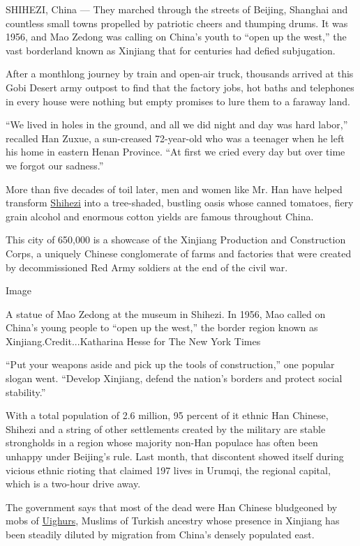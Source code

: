 SHIHEZI, China --- They marched through the streets of Beijing, Shanghai
and countless small towns propelled by patriotic cheers and thumping
drums. It was 1956, and Mao Zedong was calling on China's youth to
``open up the west,'' the vast borderland known as Xinjiang that for
centuries had defied subjugation.

After a monthlong journey by train and open-air truck, thousands arrived
at this Gobi Desert army outpost to find that the factory jobs, hot
baths and telephones in every house were nothing but empty promises to
lure them to a faraway land.

``We lived in holes in the ground, and all we did night and day was hard
labor,'' recalled Han Zuxue, a sun-creased 72-year-old who was a
teenager when he left his home in eastern Henan Province. ``At first we
cried every day but over time we forgot our sadness.''

More than five decades of toil later, men and women like Mr. Han have
helped transform
\href{http://www.china.org.cn/english/2004/Oct/108620.htm}{Shihezi} into
a tree-shaded, bustling oasis whose canned tomatoes, fiery grain alcohol
and enormous cotton yields are famous throughout China.

This city of 650,000 is a showcase of the Xinjiang Production and
Construction Corps, a uniquely Chinese conglomerate of farms and
factories that were created by decommissioned Red Army soldiers at the
end of the civil war.

Image

A statue of Mao Zedong at the museum in Shihezi. In 1956, Mao called on
China's young people to ``open up the west,'' the border region known as
Xinjiang.Credit...Katharina Hesse for The New York Times

``Put your weapons aside and pick up the tools of construction,'' one
popular slogan went. ``Develop Xinjiang, defend the nation's borders and
protect social stability.''

With a total population of 2.6 million, 95 percent of it ethnic Han
Chinese, Shihezi and a string of other settlements created by the
military are stable strongholds in a region whose majority non-Han
populace has often been unhappy under Beijing's rule. Last month, that
discontent showed itself during vicious ethnic rioting that claimed 197
lives in Urumqi, the regional capital, which is a two-hour drive away.

The government says that most of the dead were Han Chinese bludgeoned by
mobs of
\href{http://www.uhrp.org/articles/855/1/Retaining-the-Loyalty-of-Xinjiangs-Hans-/index.html}{Uighurs},
Muslims of Turkish ancestry whose presence in Xinjiang has been steadily
diluted by migration from China's densely populated east.

